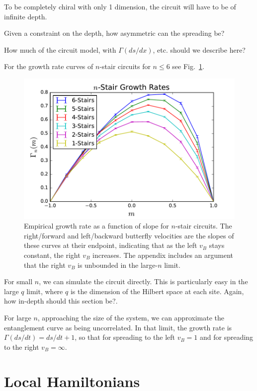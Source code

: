 \documentclass[aps,prl,reprint,superscriptaddress, longbibliography]{revtex4-1}
\newcommand{\charlie}[1]{ {\color{Magenta} {{#1}}}}
\begin{document}
To be completely chiral with only 1 dimension, the circuit will have to be of infinite depth.

Given a constraint on the depth, how asymmetric can the spreading be?

\charlie{How much of the circuit model, with $\Gamma(ds/dx)$, etc. should we describe here?}

For the growth rate curves of $n$-stair circuits for $n\le 6$ see Fig.~\ref{fig:compareRates}.

\begin{figure}
	\includegraphics[width=\columnwidth]{compareRates.pdf}
	\caption{Empirical growth rate as a function of slope for $n$-stair circuits. The right/forward and left/backward butterfly velocities are the slopes of these curves at their endpoint, indicating that as the left $v_B$ stays constant, the right $v_B$ increases. The appendix includes an argument that the right $v_B$ is unbounded in the large-$n$ limit.}
	\label{fig:compareRates}
\end{figure}	

For small $n$, we can simulate the circuit directly. This is particularly easy in the large $q$ limit, where $q$ is the dimension of the Hilbert space at each site. \charlie{Again, how in-depth should this section be?}.

For large $n$, approaching the size of the system, we can approximate the entanglement curve as being uncorrelated. In that limit, the growth rate is $\Gamma(ds/dt) = ds/dt+1$, so that for spreading to the left $v_B=1$ and for spreading to the right $v_B=\infty$.

\section{Local Hamiltonians}
\end{document}
